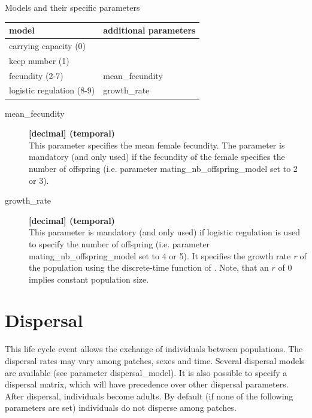 \documentclass[letterpaper,12pt,oneside]{book}
\begin{document}
Models and their specific parameters\\
\begin{tabular*}{0.92\textwidth}{ll}
 \hline model                        & additional parameters \\ 
 \hline
 carrying capacity (0)               & \\
 keep number (1)                     & \\
 fecundity (2-7)                     & mean\_fecundity\\
 logistic regulation (8-9)           & growth\_rate\\
 \hline
\end{tabular*}
\begin{description}
\item[mean\_fecundity] \textbf{[decimal] (temporal)}\\
This parameter specifies the mean female fecundity. The parameter is mandatory (and only used) if the fecundity of the female specifies the number of offspring (i.e. parameter \textsf{mating\_nb\_offspring\_model} set to 2 or 3).

\item[growth\_rate] \textbf{[decimal] (temporal)}\\
This parameter is mandatory (and only used) if logistic regulation is used to specify the number of offspring (i.e. parameter \textsf{mating\_nb\_offspring\_model} set to 4 or 5). It specifies the growth rate \textit{r} of the population using the discrete-time function of \citet{Beverton_1957}. Note, that an $r$ of 0 implies constant population size.
\end{description}


\section{Dispersal}\label{sec:dispersal}
This life cycle event allows the exchange of individuals between populations. The dispersal rates may vary among patches, sexes and time. Several dispersal models are available (see parameter \textsf{dispersal\_model}). It is also possible to specify a dispersal matrix, which will have precedence over other dispersal parameters. After dispersal, individuals become adults. By default (if none of the following parameters are set) individuals do not disperse among patches.
\end{document}
